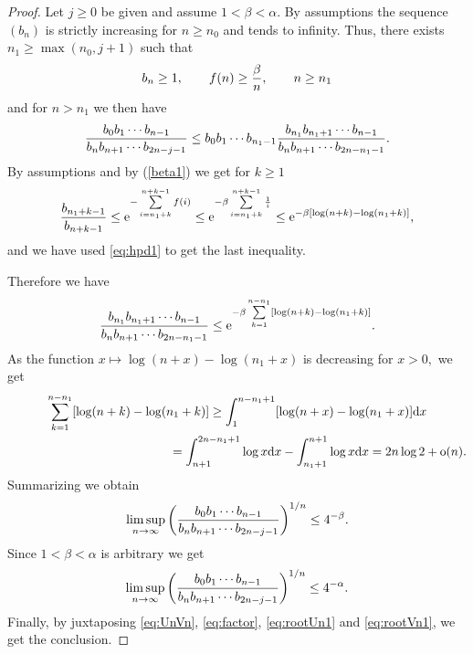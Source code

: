 \documentclass[pdftex]{sigma}
\numberwithin{equation}{section}
\begin{document}
\begin{proof}Let $j\ge 0$ be given and assume $1<\beta<\alpha$. By assumptions the sequence $(b_n)$ is strictly increasing for $n\ge n_0$ and tends to infinity. Thus, there exists $n_1\ge \max(n_0,j+1)$ such that
\begin{gather}\label{beta1}
b_n\ge 1,\qquad f(n)\ge {\beta \over n},\qquad n\ge n_1
\end{gather}
and for $n>n_1$ we then have
\begin{gather*}
 { b_0b_1\cdots b_{n-1}\over b_nb_{n+1}\cdots b_{2n-j-1}}\le b_0b_1\cdots b_{n_1-1}{b_{n_1}b_{n_1+1}\cdots b_{n-1}\over b_nb_{n+1}\cdots b_{2n-n_1-1}}.
\end{gather*}
By assumptions and by (\ref{beta1}) we get for $k\ge 1$
\begin{gather*}
{b_{n_1+k-1}\over b_{n+k-1}} \le {\rm e}^{-\sum\limits_{i=n_1+k}^{n+k-1} f(i)}\le {\rm e}^{-\beta \sum\limits_{i=n_1+k}^{n+k-1}{1\over i}} \le {\rm e}^{-\beta [\log (n+k)-\log (n_1+k)]},
\end{gather*}
and we have used \eqref{eq:hpd1} to get the last inequality.

Therefore we have
\begin{gather*}
 {b_{n_1}b_{n_1+1}\cdots b_{n-1}\over b_nb_{n+1}\cdots b_{2n-n_1-1}}\le {\rm e}^{-\beta \sum\limits_{k=1}^{n-n_1} [\log(n+k)-\log(n_1+k)]}.
\end{gather*}
As the function $x\longmapsto\log(n+x)-\log(n_1+x)$ is decreasing for $x>0,$ we get
\begin{gather*}
\sum_{k=1}^{n-n_1} [\log(n+k)-\log(n_1+k)]\ge \int_1^{n-n_1+1}[\log (n+x)-\log(n_1+x)]{\rm d}x\\
\hphantom{\sum_{k=1}^{n-n_1} [\log(n+k)-\log(n_1+k)]}{}=\int_{n+1}^{2n-n_1+1}\log x{\rm d}x -\int_{n_1+1}^{n+1}\log x{\rm d}x = 2n\log 2+{\rm o}(n).
\end{gather*}
Summarizing we obtain
\begin{gather*}
\limsup_{n\to\infty}\left ({ b_0b_1\cdots b_{n-1}\over b_nb_{n+1}\cdots b_{2n-j-1}}\right )^{1/n}\le 4^{-\beta}.
\end{gather*}
Since $1<\beta<\alpha$ is arbitrary we get
\begin{gather}\label{eq:factor}
\limsup_{n\to\infty}\left ({ b_0b_1\cdots b_{n-1}\over b_nb_{n+1}\cdots b_{2n-j-1}}\right )^{1/n}\le 4^{-\alpha}.
\end{gather}
Finally, by juxtaposing \eqref{eq:UnVn}, \eqref{eq:factor}, \eqref{eq:rootUn1} and \eqref{eq:rootVn1}, we get
the conclusion.
\end{proof}
\end{document}
